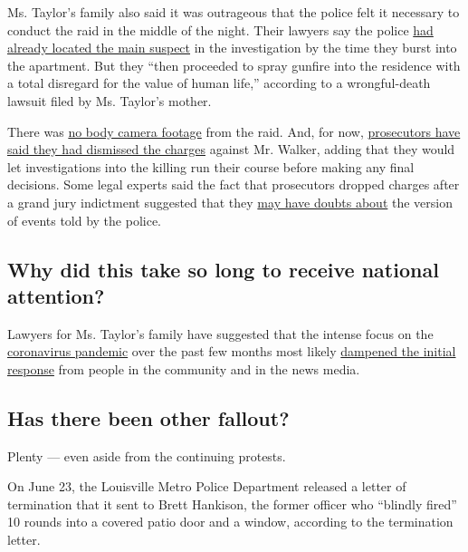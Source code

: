 Ms. Taylor's family also said it was outrageous that the police felt it
necessary to conduct the raid in the middle of the night. Their lawyers
say the police
\href{https://www.nytimes3xbfgragh.onion/2020/05/14/us/breonna-taylor-louisville-shooting.html}{had
already located the main suspect} in the investigation by the time they
burst into the apartment. But they ``then proceeded to spray gunfire
into the residence with a total disregard for the value of human life,''
according to a wrongful-death lawsuit filed by Ms. Taylor's mother.

There was
\href{https://www.facebookcorewwwi.onion/LMPD.ky/videos/206839417221050/}{no
body camera footage} from the raid. And, for now,
\href{https://www.nytimes3xbfgragh.onion/2020/05/22/us/Breonna-Taylor-Kenneth-Walker.html}{prosecutors
have said they had dismissed the charges} against Mr. Walker, adding
that they would let investigations into the killing run their course
before making any final decisions. Some legal experts said the fact that
prosecutors dropped charges after a grand jury indictment suggested that
they
\href{https://www.nytimes3xbfgragh.onion/2020/05/22/us/Breonna-Taylor-Kenneth-Walker.html}{may
have doubts about} the version of events told by the police.

\hypertarget{why-did-this-take-so-long-to-receive-national-attention}{%
\subsection{Why did this take so long to receive national
attention?}\label{why-did-this-take-so-long-to-receive-national-attention}}

Lawyers for Ms. Taylor's family have suggested that the intense focus on
the
\href{https://www.nytimes3xbfgragh.onion/news-event/coronavirus}{coronavirus
pandemic} over the past few months most likely
\href{https://www.courier-journal.com/story/news/crime/2020/05/12/mother-breonna-taylor-louisville-emt-shot-police-speaks-out/3116777001/}{dampened
the initial response} from people in the community and in the news
media.

\hypertarget{has-there-been-other-fallout}{%
\subsection{Has there been other
fallout?}\label{has-there-been-other-fallout}}

Plenty --- even aside from the continuing protests.

On June 23, the Louisville Metro Police Department released a letter of
termination that it sent to Brett Hankison, the former officer who
``blindly fired'' 10 rounds into a covered patio door and a window,
according to the termination letter.

